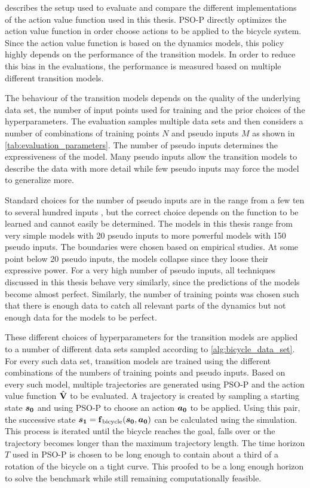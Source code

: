  describes the setup used to evaluate and compare the different implementations of the action value function used in this thesis.
PSO-P directly optimizes the action value function in order choose actions to be applied to the bicycle system.
Since the action value function is based on the dynamics models, this policy highly depends on the performance of the transition models.
In order to reduce this bias in the evaluations, the performance is measured based on multiple different transition models.

The behaviour of the transition models depends on the quality of the underlying data set, the number of input points used for training and the prior choices of the hyperparameters.
The evaluation samples multiple data sets and then considers a number of combinations of training points $N$ and pseudo inputs $M$ as shown in \cref{tab:evaluation_parameters}.
The number of pseudo inputs determines the expressiveness of the model.
Many pseudo inputs allow the transition models to describe the data with more detail while few pseudo inputs may force the model to generalize more.

Standard choices for the number of pseudo inputs are in the range from a few ten to several hundred inputs \cite{snelson_flexible_2007}, but the correct choice depends on the function to be learned and cannot easily be determined.
The models in this thesis range from very simple models with 20 pseudo inputs to more powerful models with 150 pseudo inputs.
The boundaries were chosen based on empirical studies.
At some point below 20 pseudo inputs, the models collapse since they loose their expressive power.
For a very high number of pseudo inputs, all techniques discussed in this thesis behave very similarly, since the predictions of the models become almost perfect.
Similarly, the number of training points was chosen such that there is enough data to catch all relevant parts of the dynamics but not enough data for the models to be perfect.

These different choices of hyperparameters for the transition models are applied to a number of different data sets sampled according to \cref{alg:bicycle_data_set}.
For every such data set, transition models are trained using the different combinations of the numbers of training points and pseudo inputs.
Based on every such model, multiple trajectories are generated using PSO-P and the action value function $\operatorname{\hat{\operatorname{\mathbf{V}}}}$ to be evaluated.
A trajectory is created by sampling a starting state $\bm{s_0}$ and using PSO-P to choose an action $\bm{a_0}$ to be applied.
Using this pair, the successive state $\bm{s_1} = \operatorname{\operatorname{\mathbf{f}}_{\text{bicycle}}}(\bm{s_0}, \bm{a_0})$ can be calculated using the simulation.
This process is iterated until the bicycle reaches the goal, falls over or the trajectory becomes longer than the maximum trajectory length.
The time horizon $T$ used in PSO-P is chosen to be long enough to contain about a third of a rotation of the bicycle on a tight curve.
This proofed to be a long enough horizon to solve the benchmark while still remaining computationally feasible.

